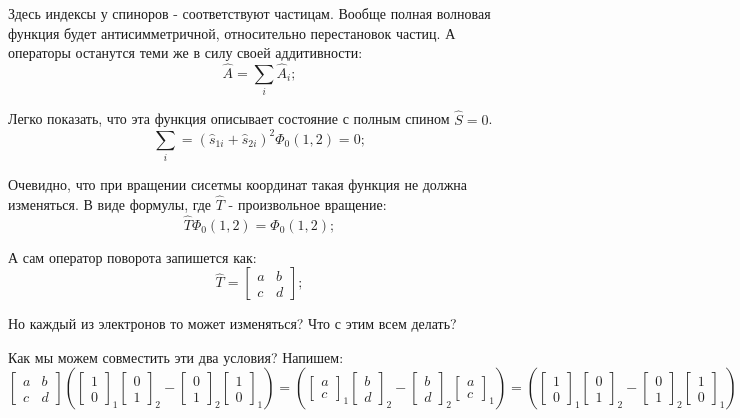 \documentclass[a4paper, 14pt, russian]{article}
\newcommand{\be}{\begin{equation}}
\newcommand{\ee}{\end{equation}}
\begin{document}
	Здесь индексы у спиноров - соответствуют частицам.
	Вообще полная волновая функция будет антисимметричной,
	относительно перестановок частиц. А операторы останутся теми же
	в силу своей аддитивности:
	\be
		\hat A = \sum_i \hat{A}_i;
	\ee

	Легко показать, что эта функция описывает состояние с полным спином 
	$\hat S = 0$. 
	\be
		\sum_i = (\hat{s}_{1i} + \hat{s}_{2i})^2 \Phi_0(1,2) = 0;
	\ee
	
	Очевидно, что при вращении сисетмы координат такая функция не должна изменяться.
	В виде формулы, где $\hat T$ - произвольное вращение:
	\be
		\hat{T} \Phi_0(1,2) = \Phi_0(1,2);
	\ee

	А сам оператор поворота запишется как:
	\be
		\hat T = \begin{bmatrix} a	& b\\	c	&	d \end{bmatrix};
	\ee

	Но каждый из электронов то может изменяться? Что с этим всем делать?

	Как мы можем совместить эти два условия? Напишем:
	\be
		\begin{bmatrix} a	& b\\	c	&	d \end{bmatrix}
		\left(
			\begin{bmatrix} 1 \\ 0 \end{bmatrix}_1
			\begin{bmatrix} 0 \\ 1 \end{bmatrix}_2
				-
			\begin{bmatrix} 0 \\ 1 \end{bmatrix}_2
			\begin{bmatrix} 1 \\ 0 \end{bmatrix}_1
		\right) = 
		\left(
				\begin{bmatrix} a \\ c \end{bmatrix}_1
				\begin{bmatrix} b \\ d \end{bmatrix}_2
					-
				\begin{bmatrix} b \\ d \end{bmatrix}_2
				\begin{bmatrix} a \\ c \end{bmatrix}_1
		\right) = 
		\left(
			\begin{bmatrix} 1 \\ 0 \end{bmatrix}_1
			\begin{bmatrix} 0 \\ 1 \end{bmatrix}_2
				-
			\begin{bmatrix} 0 \\ 1 \end{bmatrix}_2
			\begin{bmatrix} 1 \\ 0 \end{bmatrix}_1
		\right)
	\ee
\end{document}
